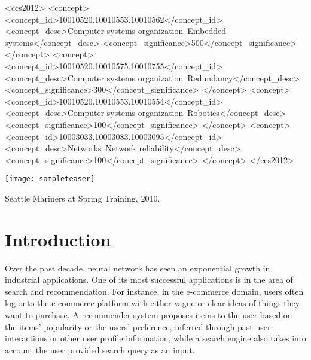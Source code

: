 
\begin{CCSXML}
<ccs2012>
 <concept>
  <concept_id>10010520.10010553.10010562</concept_id>
  <concept_desc>Computer systems organization~Embedded systems</concept_desc>
  <concept_significance>500</concept_significance>
 </concept>
 <concept>
  <concept_id>10010520.10010575.10010755</concept_id>
  <concept_desc>Computer systems organization~Redundancy</concept_desc>
  <concept_significance>300</concept_significance>
 </concept>
 <concept>
  <concept_id>10010520.10010553.10010554</concept_id>
  <concept_desc>Computer systems organization~Robotics</concept_desc>
  <concept_significance>100</concept_significance>
 </concept>
 <concept>
  <concept_id>10003033.10003083.10003095</concept_id>
  <concept_desc>Networks~Network reliability</concept_desc>
  <concept_significance>100</concept_significance>
 </concept>
</ccs2012>
\end{CCSXML}



\begin{teaserfigure}
  \texttt{[image: sampleteaser]}
  \caption{Seattle Mariners at Spring Training, 2010.}
  \label{fig:teaser}
\end{teaserfigure}

\section{Introduction}
\label{sec:introduction}

Over the past decade, neural network has seen an exponential growth in industrial applications. One of its most successful applications is in the area of search and recommendation. For instance, in the e-commerce domain, users often log onto the e-commerce platform with either vague or clear ideas of things they want to purchase. A recommender system proposes items to the user based on the items' popularity or the users' preference, inferred through past user interactions or other user profile information, while a search engine also takes into account the user provided search query as an input.

